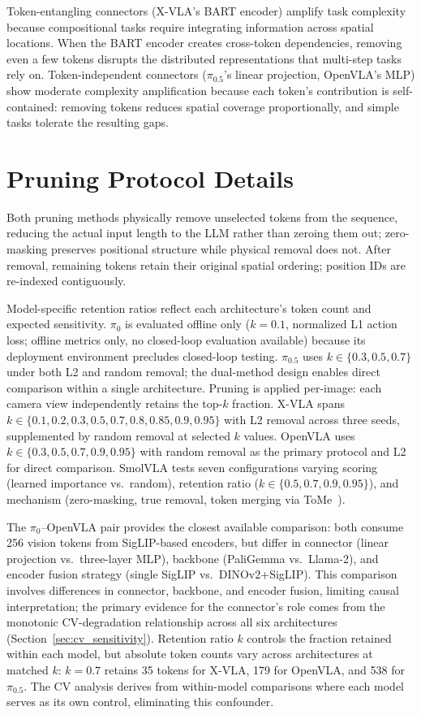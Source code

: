 Token-entangling connectors (X-VLA's BART encoder) amplify task complexity because compositional tasks require integrating information across spatial locations. When the BART encoder creates cross-token dependencies, removing even a few tokens disrupts the distributed representations that multi-step tasks rely on. Token-independent connectors ($\pi_{0.5}$'s linear projection, OpenVLA's MLP) show moderate complexity amplification because each token's contribution is self-contained: removing tokens reduces spatial coverage proportionally, and simple tasks tolerate the resulting gaps.


\section{Pruning Protocol Details}
\label{app:pruning_details}

Both pruning methods physically remove unselected tokens from the sequence, reducing the actual input length to the LLM rather than zeroing them out; zero-masking preserves positional structure while physical removal does not. After removal, remaining tokens retain their original spatial ordering; position IDs are re-indexed contiguously.

Model-specific retention ratios reflect each architecture's token count and expected sensitivity. $\pi_{0}$ is evaluated offline only ($k{=}0.1$, normalized L1 action loss; offline metrics only, no closed-loop evaluation available) because its deployment environment precludes closed-loop testing. $\pi_{0.5}$ uses $k \in \{0.3, 0.5, 0.7\}$ under both L2 and random removal; the dual-method design enables direct comparison within a single architecture. Pruning is applied per-image: each camera view independently retains the top-$k$ fraction. X-VLA spans $k \in \{0.1, 0.2, 0.3, 0.5, 0.7, 0.8, 0.85, 0.9, 0.95\}$ with L2 removal across three seeds, supplemented by random removal at selected $k$ values. OpenVLA uses $k \in \{0.3, 0.5, 0.7, 0.9, 0.95\}$ with random removal as the primary protocol and L2 for direct comparison. SmolVLA tests seven configurations varying scoring (learned importance vs.\ random), retention ratio ($k \in \{0.5, 0.7, 0.9, 0.95\}$), and mechanism (zero-masking, true removal, token merging via ToMe~\cite{bolya2023tome}).

The $\pi_{0}$--OpenVLA pair provides the closest available comparison: both consume 256 vision tokens from SigLIP-based encoders, but differ in connector (linear projection vs.\ three-layer MLP), backbone (PaliGemma vs.\ Llama-2), and encoder fusion strategy (single SigLIP vs.\ DINOv2+SigLIP). This comparison involves differences in connector, backbone, and encoder fusion, limiting causal interpretation; the primary evidence for the connector's role comes from the monotonic CV-degradation relationship across all six architectures (Section~\ref{sec:cv_sensitivity}). Retention ratio $k$ controls the fraction retained within each model, but absolute token counts vary across architectures at matched $k$: $k{=}0.7$ retains 35 tokens for X-VLA, 179 for OpenVLA, and 538 for $\pi_{0.5}$. The CV analysis derives from within-model comparisons where each model serves as its own control, eliminating this confounder.


